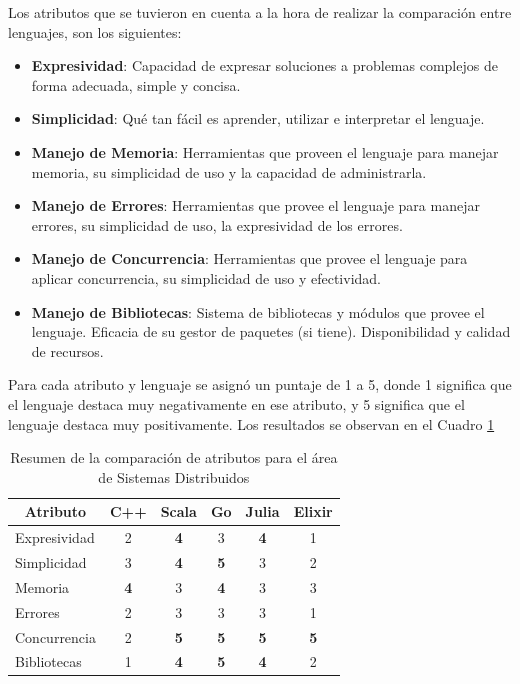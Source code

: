 \documentclass[11pt]{article}
\newcommand{\badMetric}[1]{{\color{BrickRed}#1}}
\newcommand{\goodMetric}[1]{{\textbf{#1}}}
\begin{document}
Los atributos que se tuvieron en cuenta a la hora de realizar la comparación entre lenguajes, son los siguientes:

\begin{itemize}
    \item \textbf{Expresividad}: Capacidad de expresar soluciones a problemas complejos de forma adecuada, simple y concisa.
    \item \textbf{Simplicidad}: Qué tan fácil es aprender, utilizar e interpretar el lenguaje.
    \item \textbf{Manejo de Memoria}: Herramientas que proveen el lenguaje para manejar memoria, su simplicidad de uso y la capacidad de administrarla.
    \item \textbf{Manejo de Errores}: Herramientas que provee el lenguaje para manejar errores, su simplicidad de uso, la expresividad de los errores.
    \item \textbf{Manejo de Concurrencia}: Herramientas que provee el lenguaje para aplicar concurrencia, su simplicidad de uso y efectividad.
    \item \textbf{Manejo de Bibliotecas}: Sistema de bibliotecas y módulos que provee el lenguaje. Eficacia de su gestor de paquetes (si tiene). Disponibilidad y calidad de recursos.
\end{itemize}

Para cada atributo y lenguaje se asignó un puntaje de 1 a 5, donde 1 significa que el lenguaje destaca muy negativamente en ese atributo, y 5 significa que el lenguaje destaca muy positivamente. Los resultados se observan en el Cuadro \ref{tab:sis_dist:experiences}

\begin{table}[h]
\centering
\begin{tabular}{|l|c|c|c|c|c|}
\hline
\multicolumn{1}{|c|}{Atributo} & C++ & Scala & Go & Julia & Elixir \\ \hline
Expresividad & \badMetric{2} & \goodMetric{4} & 3 & \goodMetric{4} & \badMetric{1} \\ \hline
Simplicidad & 3 & \goodMetric{4} & \goodMetric{5} & 3 & \badMetric{2} \\ \hline
Memoria & \goodMetric{4} & 3 & \goodMetric{4} & 3 & 3 \\ \hline
Errores & \badMetric{2} & 3 & 3 & 3 & \badMetric{1} \\ \hline
Concurrencia & \badMetric{2} & \goodMetric{5} & \goodMetric{5} & \goodMetric{5} & \goodMetric{5} \\ \hline
Bibliotecas & \badMetric{1} & \goodMetric{4} & \goodMetric{5} & \goodMetric{4} & \badMetric{2} \\ \hline
\end{tabular}
\caption{Resumen de la comparación de atributos para el área de Sistemas Distribuidos}
\label{tab:sis_dist:experiences}
\end{table}
\end{document}
